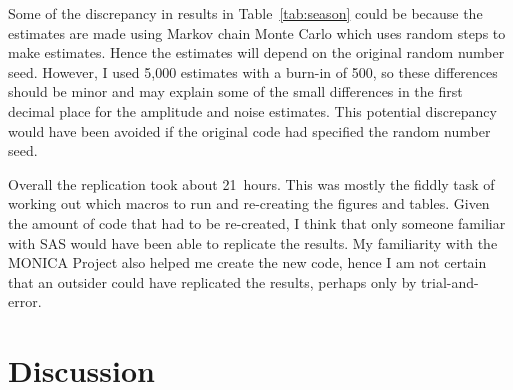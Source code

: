 Some of the discrepancy in results in Table~\ref{tab:season} could be because the estimates are made using Markov chain Monte Carlo which uses random steps to make estimates. Hence the estimates will depend on the original random number seed. However, I used 5,000 estimates with a burn-in of 500, so these differences should be minor and may explain some of the small differences in the first decimal place for the amplitude and noise estimates. This potential discrepancy would have been avoided if the original code had specified the random number seed.


Overall the replication took about 21~hours. This was mostly the fiddly task of working out which macros to run and re-creating the figures and tables. Given the amount of code that had to be re-created, I think that only someone  familiar with SAS would have been able to replicate the results. My familiarity with the MONICA Project also helped me create the new code, hence I am not certain that an outsider could have replicated the results, perhaps only by trial-and-error.



\section{Discussion}


